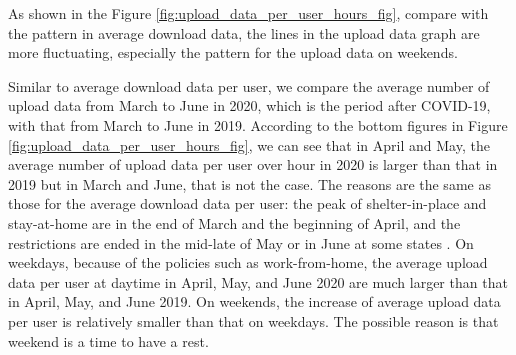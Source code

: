 
As shown in the Figure \ref{fig:upload_data_per_user_hours_fig}, compare with the pattern in average download data, the lines in the upload data graph are more fluctuating, especially the pattern for the upload data on weekends. 

Similar to average download data per user, we compare the average number of upload data from March to June in 2020, which is the period after COVID-19, with that from March to June in 2019. According to the bottom figures in Figure \ref{fig:upload_data_per_user_hours_fig}, we can see that in April and May, the average number of upload data per user over hour in 2020 is larger than that in 2019 but in March and June, that is not the case. The reasons are the same as those for the average download data per user: the peak of shelter-in-place and stay-at-home are in the end of March and the beginning of April, and the restrictions are ended in the mid-late of May or in June at some states \cite{covid19restriction}. On weekdays, because of the policies such as work-from-home, the average upload data per user at daytime in April, May, and June 2020 are much larger than that in April, May, and June 2019. On weekends, the increase of average upload data per user is relatively smaller than that on weekdays. The possible reason is that weekend is a time to have a rest.  